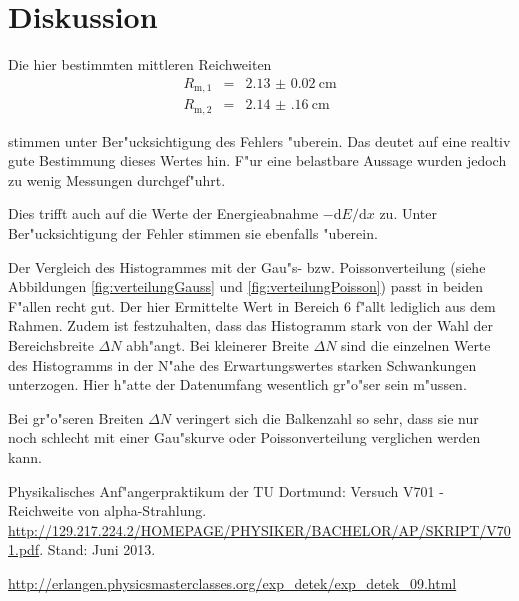 \section{Diskussion}
\label{sec:diskussion}
	Die hier bestimmten mittleren Reichweiten 
	\begin{eqnarray*}
		R_\mathrm{m,1} & = & \SI{2.13(2)}{\centi \meter} \\	
		R_\mathrm{m,2} & = & \SI{2.14(16)}{\centi \meter}
	\end{eqnarray*}

	stimmen unter Ber"ucksichtigung des Fehlers "uberein.
	Das deutet auf eine realtiv gute Bestimmung dieses Wertes hin.
	F"ur eine belastbare Aussage wurden jedoch zu wenig Messungen durchgef"uhrt.

	Dies trifft auch auf die Werte der Energieabnahme $- \mathrm{d} E / \mathrm{d} x$ zu.
	Unter Ber"ucksichtigung der Fehler stimmen sie ebenfalls "uberein.

	Der Vergleich des Histogrammes mit der Gau"s- bzw. Poissonverteilung (siehe Abbildungen \ref{fig:verteilungGauss} und \ref{fig:verteilungPoisson}) passt in beiden F"allen recht gut.
	Der hier Ermittelte Wert in Bereich 6 f"allt lediglich aus dem Rahmen.
	Zudem ist festzuhalten, dass das Histogramm stark von der Wahl der Bereichsbreite $\Delta N$ abh"angt.
	Bei kleinerer Breite $\Delta N$ sind die einzelnen Werte des Histogramms in der N"ahe des Erwartungswertes starken Schwankungen unterzogen.
	Hier h"atte der Datenumfang wesentlich gr"o"ser sein m"ussen.

	Bei gr"o"seren Breiten $\Delta N$ veringert sich die Balkenzahl so sehr, dass sie nur noch schlecht mit einer Gau"skurve oder Poissonverteilung verglichen werden kann.

\begin{thebibliography}{9}
	 Physikalisches Anf"angerpraktikum der TU Dortmund: Versuch V701 - Reichweite von alpha-Strahlung. \url{http://129.217.224.2/HOMEPAGE/PHYSIKER/BACHELOR/AP/SKRIPT/V701.pdf}. Stand: Juni 2013.

	 \url{http://erlangen.physicsmasterclasses.org/exp_detek/exp_detek_09.html}
\end{thebibliography}

